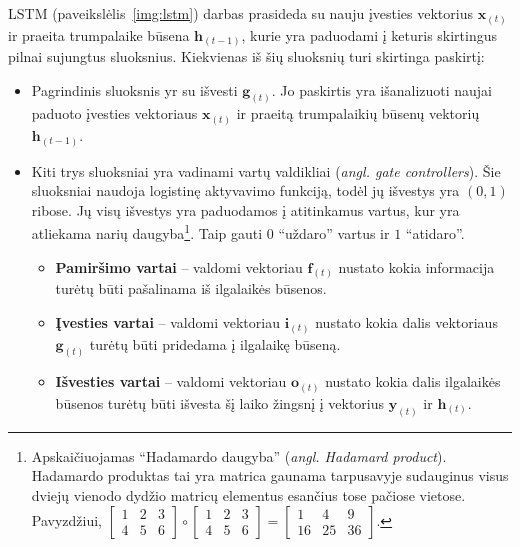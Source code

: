 \documentclass{VUMIFPSbakalaurinis}
\begin{document}
{	LSTM (paveikslėlis~\ref{img:lstm}) darbas prasideda su nauju įvesties vektorius \(\mathbf{x}_{(t)}\) ir praeita trumpalaike būsena \(\mathbf{h}_{(t-1)}\), kurie yra paduodami į keturis skirtingus pilnai sujungtus sluoksnius. Kiekvienas iš šių sluoksnių turi skirtinga paskirtį:
	
	\begin{itemize}
		\item Pagrindinis sluoksnis yr su išvesti \(\mathbf{g}_{(t)}\). Jo paskirtis yra išanalizuoti naujai paduoto įvesties vektoriaus \(\mathbf{x}_{(t)}\) ir praeitą trumpalaikių būsenų vektorių \(\mathbf{h}_{(t-1)}\).
		\item Kiti trys sluoksniai yra vadinami vartų valdikliai (\textit{angl. gate controllers}). Šie sluoksniai naudoja logistinę aktyvavimo funkciją, todėl jų išvestys yra \((0, 1)\) ribose. Jų visų išvestys yra paduodamos į atitinkamus vartus, kur yra atliekama narių daugyba\footnote{Apskaičiuojamas \enquote{Hadamardo daugyba} (\textit{angl. Hadamard product}). Hadamardo produktas tai yra matrica gaunama tarpusavyje sudauginus visus dviejų vienodo dydžio matricų elementus esančius tose pačiose vietose. Pavyzdžiui, 
			\(\begin{bmatrix} 1 & 2 & 3 \\ 4 & 5 & 6 \end{bmatrix} \circ
			\begin{bmatrix} 1 & 2 & 3 \\ 4 & 5 & 6 \end{bmatrix} =			
			\begin{bmatrix} 1 & 4 & 9 \\ 16 & 25 & 36 \end{bmatrix}\).
		}. Taip gauti \(0\) \enquote{uždaro} vartus ir \(1\) \enquote{atidaro}.
		\begin{itemize}
			\item \textbf{Pamiršimo vartai} -- valdomi vektoriau \(\mathbf{f}_{(t)}\) nustato kokia informacija turėtų būti pašalinama iš ilgalaikės būsenos.
			\item \textbf{Įvesties vartai} -- valdomi vektoriau \(\mathbf{i}_{(t)}\) nustato kokia dalis vektoriaus \(\mathbf{g}_{(t)}\) turėtų būti pridedama į ilgalaikę būseną.
			\item \textbf{Išvesties vartai} -- valdomi vektoriau \(\mathbf{o}_{(t)}\) nustato kokia dalis ilgalaikės būsenos turėtų būti išvesta šį laiko žingsnį į vektorius \(\mathbf{y}_{(t)}\) ir \(\mathbf{h}_{(t)}\).
		\end{itemize}
	\end{itemize}
}
\end{document}
